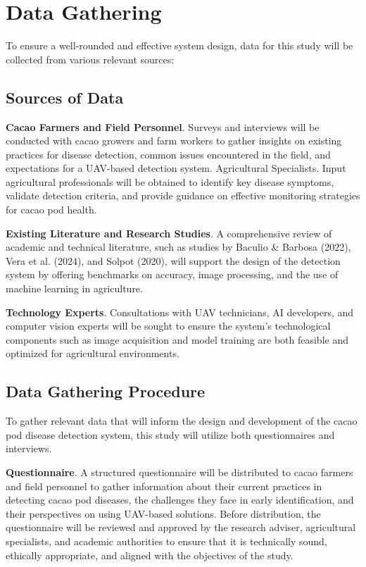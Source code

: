 	\section{Data Gathering}
	To ensure a well-rounded and effective system design, data for this study will be collected from various relevant sources:
	\subsection{Sources of Data}
	\textbf{Cacao Farmers and Field Personnel}. Surveys and interviews will be conducted with cacao growers and farm workers to gather insights on existing practices for disease detection, common issues encountered in the field, and expectations for a UAV-based detection system. Agricultural Specialists. Input agricultural professionals will be obtained to identify key disease symptoms, validate detection criteria, and provide guidance on effective monitoring strategies for cacao pod health. 
	
	\textbf{Existing Literature and Research Studies}. A comprehensive review of academic and technical literature, such as studies by Baculio \& Barbosa (2022), Vera et al. (2024), and Solpot (2020), will support the design of the detection system by offering benchmarks on accuracy, image processing, and the use of machine learning in agriculture. 
	
	\textbf{Technology Experts}. Consultations with UAV technicians, AI developers, and computer vision experts will be sought to ensure the system’s technological components such as image acquisition and model training are both feasible and optimized for agricultural environments.
	
	\subsection{Data Gathering Procedure}
	
	To gather relevant data that will inform the design and development of the cacao pod disease detection system, this study will utilize both questionnaires and interviews. 
	
	\textbf{Questionnaire}. A structured questionnaire will be distributed to cacao farmers and field personnel to gather information about their current practices in detecting cacao pod diseases, the challenges they face in early identification, and their perspectives on using UAV-based solutions. Before distribution, the questionnaire will be reviewed and approved by the research adviser, agricultural specialists, and academic authorities to ensure that it is technically sound, ethically appropriate, and aligned with the objectives of the study.
	
